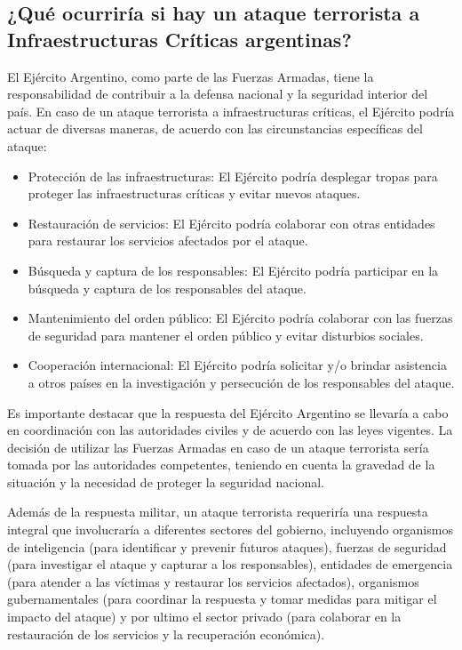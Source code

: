 \documentclass{article}
\providecommand{\tightlist}{%
  \setlength{\itemsep}{0pt}\setlength{\parskip}{0pt}}
\begin{document}
\hypertarget{quuxe9-ocurriruxeda-si-hay-un-ataque-terrorista-a-infraestructuras-cruxedticas-argentinas}{%
\subsection{¿Qué ocurriría si hay un ataque terrorista a
Infraestructuras Críticas
argentinas?}\label{quuxe9-ocurriruxeda-si-hay-un-ataque-terrorista-a-infraestructuras-cruxedticas-argentinas}}

El Ejército Argentino, como parte de las Fuerzas Armadas, tiene la
responsabilidad de contribuir a la defensa nacional y la seguridad
interior del país. En caso de un ataque terrorista a infraestructuras
críticas, el Ejército podría actuar de diversas maneras, de acuerdo con
las circunstancias específicas del ataque:

\begin{itemize}
\tightlist
\item
  Protección de las infraestructuras: El Ejército podría desplegar
  tropas para proteger las infraestructuras críticas y evitar nuevos
  ataques.
\item
  Restauración de servicios: El Ejército podría colaborar con otras
  entidades para restaurar los servicios afectados por el ataque.
\item
  Búsqueda y captura de los responsables: El Ejército podría participar
  en la búsqueda y captura de los responsables del ataque.
\item
  Mantenimiento del orden público: El Ejército podría colaborar con las
  fuerzas de seguridad para mantener el orden público y evitar
  disturbios sociales.
\item
  Cooperación internacional: El Ejército podría solicitar y/o brindar
  asistencia a otros países en la investigación y persecución de los
  responsables del ataque.
\end{itemize}

Es importante destacar que la respuesta del Ejército Argentino se
llevaría a cabo en coordinación con las autoridades civiles y de acuerdo
con las leyes vigentes. La decisión de utilizar las Fuerzas Armadas en
caso de un ataque terrorista sería tomada por las autoridades
competentes, teniendo en cuenta la gravedad de la situación y la
necesidad de proteger la seguridad nacional.

Además de la respuesta militar, un ataque terrorista requeriría una
respuesta integral que involucraría a diferentes sectores del gobierno,
incluyendo organismos de inteligencia (para identificar y prevenir
futuros ataques), fuerzas de seguridad (para investigar el ataque y
capturar a los responsables), entidades de emergencia (para atender a
las víctimas y restaurar los servicios afectados), organismos
gubernamentales (para coordinar la respuesta y tomar medidas para
mitigar el impacto del ataque) y por ultimo el sector privado (para
colaborar en la restauración de los servicios y la recuperación
económica).
\end{document}
